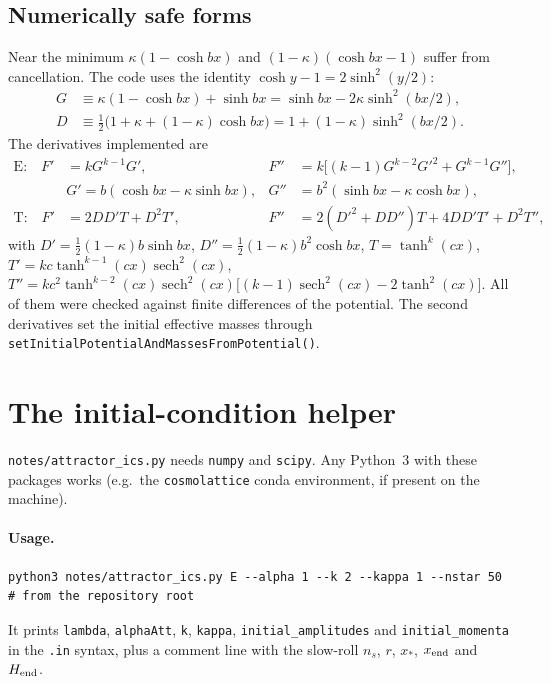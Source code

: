 \documentclass[11pt,a4paper]{article}
\DeclareMathOperator{\sech}{sech}
\newcommand{\file}[1]{\texttt{#1}}
\begin{document}
\subsection{Numerically safe forms}
Near the minimum $\kappa(1-\cosh bx)$ and $(1-\kappa)(\cosh bx-1)$ suffer from cancellation. The code uses the identity $\cosh y-1=2\sinh^2(y/2)$:
\begin{align}
G &\equiv \kappa(1-\cosh bx)+\sinh bx = \sinh bx-2\kappa\sinh^2(bx/2), \\
D &\equiv \tfrac12\big(1+\kappa+(1-\kappa)\cosh bx\big) = 1+(1-\kappa)\sinh^2(bx/2).
\end{align}
The derivatives implemented are
\begin{align}
\text{E:}\quad F' &= kG^{k-1}G', & F'' &= k\big[(k-1)G^{k-2}G'^2+G^{k-1}G''\big],\\
& G'=b(\cosh bx-\kappa\sinh bx), & G''&=b^2(\sinh bx-\kappa\cosh bx),\\
\text{T:}\quad F' &= 2DD'T+D^2T', & F''&=2(D'^2+DD'')T+4DD'T'+D^2T'',
\end{align}
with $D'=\tfrac12(1-\kappa)b\sinh bx$, $D''=\tfrac12(1-\kappa)b^2\cosh bx$, $T=\tanh^k(cx)$, $T'=kc\tanh^{k-1}(cx)\sech^2(cx)$, $T''=kc^2\tanh^{k-2}(cx)\sech^2(cx)\big[(k-1)\sech^2(cx)-2\tanh^2(cx)\big]$. All of them were checked against finite differences of the potential. The second derivatives set the initial effective masses through \texttt{setInitialPotentialAndMassesFromPotential()}.

\section{The initial-condition helper}
\label{sec:helper}
\file{notes/attractor\_ics.py} needs \texttt{numpy} and \texttt{scipy}. Any Python~3 with these packages works (e.g.\ the \texttt{cosmolattice} conda environment, if present on the machine).

\paragraph{Usage.}
\begin{lstlisting}
python3 notes/attractor_ics.py E --alpha 1 --k 2 --kappa 1 --nstar 50   # from the repository root
\end{lstlisting}
It prints \texttt{lambda}, \texttt{alphaAtt}, \texttt{k}, \texttt{kappa}, \texttt{initial\_amplitudes} and \texttt{initial\_momenta} in the \file{.in} syntax, plus a comment line with the slow-roll $n_s$, $r$, $x_*$, $x_{\rm end}$ and $H_{\rm end}$.
\end{document}
